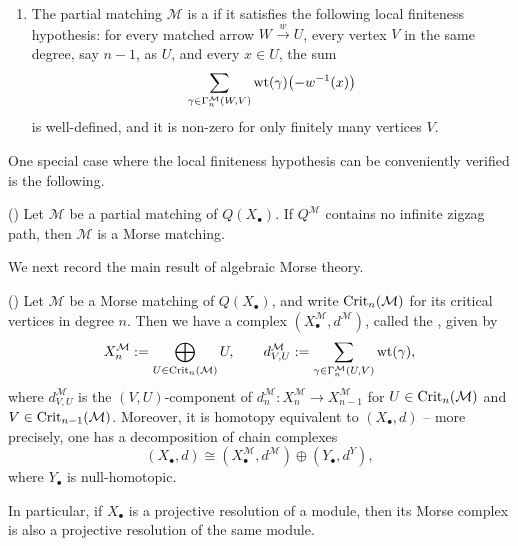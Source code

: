 \documentclass[a4paper,leqno]{amsart}
\begin{document}
\begin{dfn}
\begin{enumerate}
\item The partial matching $\mathcal M$ is a  if it satisfies the following local finiteness hypothesis: for every matched arrow $W\xrightarrow{w}U$, every vertex $V$ in the same degree, say $n-1$, as $U$, and every $x\in U$, the sum
\[
 \sum_{\gamma\in\Gamma_n^{\mathcal M}(W,V)}
 \operatorname{wt}(\gamma)\bigl(-w^{-1}(x)\bigr)
\]
is well-defined, and it is non-zero for only finitely many vertices $V$.
\end{enumerate}
\end{dfn}

One special case where the local finiteness hypothesis  can be conveniently verified is the following.

\begin{prop}\textnormal{(\cite[Proposition~3.2]{CLZ26})}
\label{prop:morse-sufficient-condition}
Let $\mathcal M$ be a partial matching of $Q(X_\bullet)$.  If $Q^{\mathcal M}$ contains no infinite zigzag path, then $\mathcal M$ is a Morse matching.
\end{prop}

We next record the main result of algebraic Morse theory.

\begin{thm}\textnormal{(\cite[Theorem~3.3]{CLZ26})}
\label{thm:algebraic-morse}
Let $\mathcal M$ be a Morse matching of $Q(X_\bullet)$, and write $\operatorname{Crit}_n(\mathcal M)$ for its critical vertices in degree $n$.  Then we have a complex $(X_\bullet^{\mathcal{M}},d^{\mathcal{M}})$, called the , given by
\[
 X_n^{\mathcal M}
 :=\bigoplus_{U\in\operatorname{Crit}_n(\mathcal M)}U,  \qquad d_{V,U}^{\mathcal M}
 :=\sum_{\gamma\in\Gamma_n^{\mathcal M}(U,V)} \operatorname{wt}(\gamma),
\]
where $d^{\mathcal{M}}_{V,U}$ is the $(V,U)$-component of $d_n^{\mathcal{M}}:X_n^{\mathcal{M}}\to X_{n-1}^{\mathcal{M}}$ for $U\in\operatorname{Crit}_n(\mathcal M)$ and $V\in\operatorname{Crit}_{n-1}(\mathcal M)$.
Moreover, it is homotopy equivalent to $(X_\bullet,d)$ -- more precisely, one has a decomposition of chain complexes
\[
 (X_\bullet,d)\cong
 (X_\bullet^{\mathcal M},d^{\mathcal M})
 \oplus(Y_\bullet,d^Y),
\]
where $Y_\bullet$ is null-homotopic.
\end{thm}

In particular, if $X_\bullet$ is a projective resolution of a module, then its Morse complex is also a projective resolution of the same module.
\end{document}
